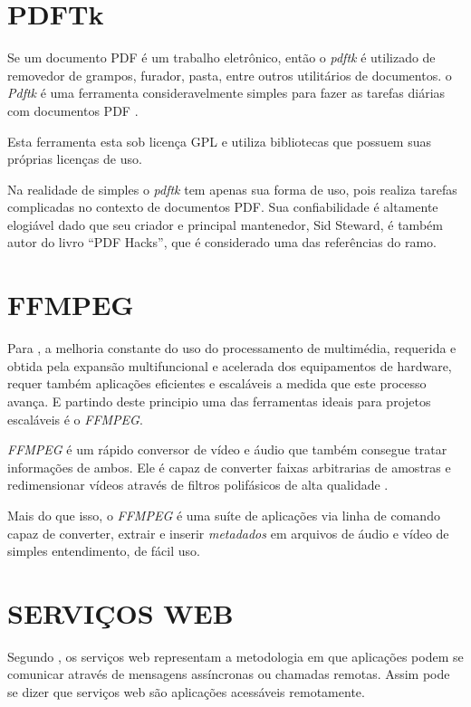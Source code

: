 \section{PDFTk}

Se um documento PDF é um trabalho eletrônico, então o \textit{pdftk} é utilizado de removedor de grampos, furador, pasta, entre outros utilitários de documentos. o \textit{Pdftk} é uma ferramenta consideravelmente simples para fazer as tarefas diárias com documentos PDF \cite{STEWARD}.

Esta ferramenta esta sob licença GPL e utiliza bibliotecas que possuem suas próprias licenças de uso.

Na realidade de simples o \textit{pdftk} tem apenas sua forma de uso, pois realiza tarefas complicadas no contexto de documentos PDF. Sua confiabilidade é altamente elogiável dado que seu criador e principal mantenedor, Sid Steward, é também autor do livro “PDF Hacks”, que é considerado uma das referências do ramo.


\section{FFMPEG}

Para \cite{FFMPEG-SCALABLE}, a melhoria constante do uso do processamento de multimédia, requerida e obtida pela expansão multifuncional e acelerada dos equipamentos de hardware, requer também aplicações eficientes e escaláveis a medida que este processo avança. E partindo deste principio uma das ferramentas ideais para projetos escaláveis é o \textit{FFMPEG}.

\textit{FFMPEG} é um rápido conversor de vídeo e áudio que também consegue tratar informações de ambos. Ele é capaz de converter faixas arbitrarias de amostras e redimensionar vídeos através de filtros polifásicos de alta qualidade \cite{FFMPEG}.

Mais do que isso, o \textit{FFMPEG} é uma suíte de aplicações via linha de comando capaz de converter, extrair e inserir \textit{metadados} em arquivos de áudio e vídeo de simples entendimento, de fácil uso.


\section{SERVIÇOS WEB}

Segundo \cite{PIRNAU}, os serviços web representam a metodologia em que aplicações podem se comunicar através de mensagens assíncronas ou chamadas remotas. Assim pode se dizer que serviços web são aplicações acessáveis remotamente.

